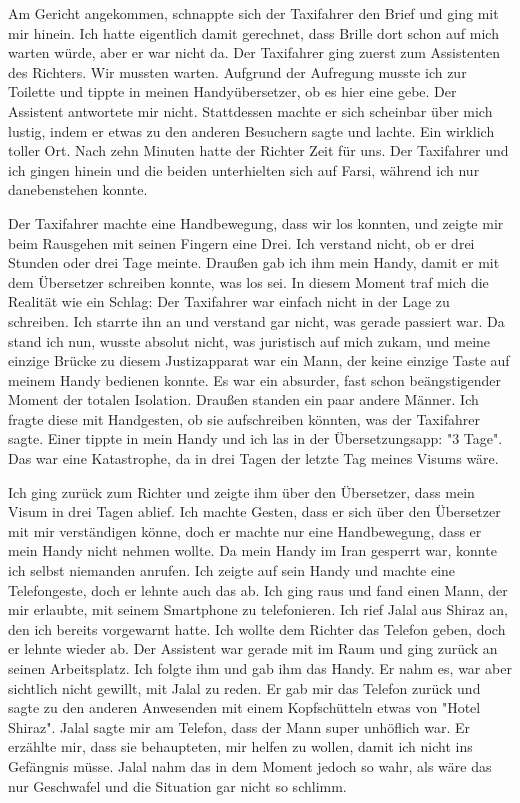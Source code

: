 Am Gericht angekommen, schnappte sich der Taxifahrer den Brief und ging mit mir hinein. Ich hatte eigentlich damit gerechnet, dass Brille dort schon auf mich warten würde, aber er war nicht da. Der Taxifahrer ging zuerst zum Assistenten des Richters. Wir mussten warten. Aufgrund der Aufregung musste ich zur Toilette und tippte in meinen Handyübersetzer, ob es hier eine gebe. Der Assistent antwortete mir nicht. Stattdessen machte er sich scheinbar über mich lustig, indem er etwas zu den anderen Besuchern sagte und lachte. Ein wirklich toller Ort. Nach zehn Minuten hatte der Richter Zeit für uns. Der Taxifahrer und ich gingen hinein und die beiden unterhielten sich auf Farsi, während ich nur danebenstehen konnte.

Der Taxifahrer machte eine Handbewegung, dass wir los konnten, und zeigte mir beim Rausgehen mit seinen Fingern eine Drei. Ich verstand nicht, ob er drei Stunden oder drei Tage meinte. Draußen gab ich ihm mein Handy, damit er mit dem Übersetzer schreiben konnte, was los sei. In diesem Moment traf mich die Realität wie ein Schlag: Der Taxifahrer war einfach nicht in der Lage zu schreiben. Ich starrte ihn an und verstand gar nicht, was gerade passiert war. Da stand ich nun, wusste absolut nicht, was juristisch auf mich zukam, und meine einzige Brücke zu diesem Justizapparat war ein Mann, der keine einzige Taste auf meinem Handy bedienen konnte. Es war ein absurder, fast schon beängstigender Moment der totalen Isolation. Draußen standen ein paar andere Männer. Ich fragte diese mit Handgesten, ob sie aufschreiben könnten, was der Taxifahrer sagte. Einer tippte in mein Handy und ich las in der Übersetzungsapp: "3 Tage". Das war eine Katastrophe, da in drei Tagen der letzte Tag meines Visums wäre.

Ich ging zurück zum Richter und zeigte ihm über den Übersetzer, dass mein Visum in drei Tagen ablief. Ich machte Gesten, dass er sich über den Übersetzer mit mir verständigen könne, doch er machte nur eine Handbewegung, dass er mein Handy nicht nehmen wollte. Da mein Handy im Iran gesperrt war, konnte ich selbst niemanden anrufen. Ich zeigte auf sein Handy und machte eine Telefongeste, doch er lehnte auch das ab. Ich ging raus und fand einen Mann, der mir erlaubte, mit seinem Smartphone zu telefonieren. Ich rief Jalal aus Shiraz an, den ich bereits vorgewarnt hatte. Ich wollte dem Richter das Telefon geben, doch er lehnte wieder ab. Der Assistent war gerade mit im Raum und ging zurück an seinen Arbeitsplatz. Ich folgte ihm und gab ihm das Handy. Er nahm es, war aber sichtlich nicht gewillt, mit Jalal zu reden. Er gab mir das Telefon zurück und sagte zu den anderen Anwesenden mit einem Kopfschütteln etwas von "Hotel Shiraz". Jalal sagte mir am Telefon, dass der Mann super unhöflich war. Er erzählte mir, dass sie behaupteten, mir helfen zu wollen, damit ich nicht ins Gefängnis müsse. Jalal nahm das in dem Moment jedoch so wahr, als wäre das nur Geschwafel und die Situation gar nicht so schlimm.

